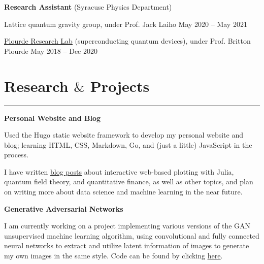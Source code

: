 \documentclass[9pt]{extarticle}
\newcommand{\myline}{\rule[\baselineskip]{\linewidth}{1pt}}
\begin{document}
\vspace{2.5pt}
\large\textbf{Research Assistant} \normalsize (Syracuse Physics Department)
\normalsize

\begin{compactitem}
\item Lattice quantum gravity group, under Prof. Jack Laiho \hfill \small May 2020 -- May 2021 
\normalsize
\item \href{https://bplourde.expressions.syr.edu/}{\underline{Plourde Research Lab}} (superconducting quantum devices), under Prof. Britton Plourde \hfill \small May 2018 -- Dec 2020
\end{compactitem}




\section{Research $\&$ Projects}

\myline

\large\textbf{Personal Website and Blog}
\normalsize

\begin{compactitem}
\item Used the Hugo static website framework to develop my personal website and blog; learning HTML, CSS, Markdown, Go, and (just a little) JavaScript in the process. 
\item I have written \href{https://aarontrowbridge.github.io/posts/}{\underline{blog posts}} about interactive web-based plotting with Julia, quantum field theory, and quantitative finance, as well as other topics, and plan on writing more about data science and machine learning in the near future. 
\end{compactitem}

\vspace{2.5pt}
\large\textbf{Generative Adversarial Networks}
\normalsize

\begin{compactitem}
\item I am currently working on a project implementing various versions of the GAN unsupervised machine learning algorithm, using convolutional and fully connected neural networks to extract and utilize latent information of images to generate my own images in the same style. Code can be found by clicking \href{https://github.com/aarontrowbridge/FluxGAN.jl}{\underline{here}}.  
\end{compactitem}
\end{document}
